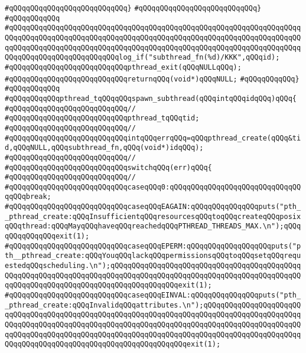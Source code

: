 \verb|#qQQqqQQqqQQqqQQqqQQqqQQqqQQq}|\newline
\verb|#qQQqqQQqqQQqqQQqqQQqqQQqqQQq}|\newline
\verb|#qQQqqQQqqQQq|\newline
\verb|#qQQqqQQqqQQqqQQqqQQqqQQqqQQqqQQqqQQqqQQqqQQqqQQqqQQqqQQqqQQqqQQqqQQqqQQqqQQqqQQqqQQqqQQqqQQqqQQqqQQqqQQqqQQqqQQqqQQqqQQqqQQqqQQqqQQqqQQqqQQqqQQqqQQqqQQqqQQqqQQqqQQqqQQqqQQqqQQqqQQqqQQqqQQqqQQqqQQqqQQqqQQqqQQqqQQqqQQqqQQqqQQqqQQqqQQqqQQqlog_if("subthread_fn(%d)/KKK",qQQqid);|\newline
\verb|#qQQqqQQqqQQqqQQqqQQqqQQqqQQqpthread_exit(qQQqNULLqQQq);|\newline
\verb|#qQQqqQQqqQQqqQQqqQQqqQQqqQQqreturnqQQq(void*)qQQqNULL;|\newline
\verb|#qQQqqQQqqQQq}|\newline
\verb|#qQQqqQQqqQQq|\newline
\verb|#qQQqqQQqqQQqpthread_tqQQqqQQqspawn_subthread(qQQqintqQQqidqQQq)qQQq{|\newline
\verb|#qQQqqQQqqQQqqQQqqQQqqQQqqQQq//|\newline
\verb|#qQQqqQQqqQQqqQQqqQQqqQQqqQQqpthread_tqQQqtid;|\newline
\verb|#qQQqqQQqqQQqqQQqqQQqqQQqqQQq//|\newline
\verb|#qQQqqQQqqQQqqQQqqQQqqQQqqQQqintqQQqerrqQQq=qQQqpthread_create(qQQq&tid,qQQqNULL,qQQqsubthread_fn,qQQq(void*)idqQQq);|\newline
\verb|#qQQqqQQqqQQqqQQqqQQqqQQqqQQq//|\newline
\verb|#qQQqqQQqqQQqqQQqqQQqqQQqqQQqswitchqQQq(err)qQQq{|\newline
\verb|#qQQqqQQqqQQqqQQqqQQqqQQqqQQq//|\newline
\verb|#qQQqqQQqqQQqqQQqqQQqqQQqqQQqcaseqQQq0:qQQqqQQqqQQqqQQqqQQqqQQqqQQqqQQqqQQqbreak;|\newline
\verb|#qQQqqQQqqQQqqQQqqQQqqQQqqQQqcaseqQQqEAGAIN:qQQqqQQqqQQqqQQqputs("pth__pthread_create:qQQqInsufficientqQQqresourcesqQQqtoqQQqcreateqQQqposixqQQqthread:qQQqMayqQQqhaveqQQqreachedqQQqPTHREAD_THREADS_MAX.\n");qQQqqQQqqQQqqQQqexit(1);|\newline
\verb|#qQQqqQQqqQQqqQQqqQQqqQQqqQQqcaseqQQqEPERM:qQQqqQQqqQQqqQQqqQQqputs("pth__pthread_create:qQQqYouqQQqlackqQQqpermissionsqQQqtoqQQqsetqQQqrequestedqQQqscheduling.\n");qQQqqQQqqQQqqQQqqQQqqQQqqQQqqQQqqQQqqQQqqQQqqQQqqQQqqQQqqQQqqQQqqQQqqQQqqQQqqQQqqQQqqQQqqQQqqQQqqQQqqQQqqQQqqQQqqQQqqQQqqQQqqQQqqQQqqQQqqQQqqQQqqQQqqQQqqQQqexit(1);|\newline
\verb|#qQQqqQQqqQQqqQQqqQQqqQQqqQQqcaseqQQqEINVAL:qQQqqQQqqQQqqQQqputs("pth__pthread_create:qQQqInvalidqQQqattributes.\n");qQQqqQQqqQQqqQQqqQQqqQQqqQQqqQQqqQQqqQQqqQQqqQQqqQQqqQQqqQQqqQQqqQQqqQQqqQQqqQQqqQQqqQQqqQQqqQQqqQQqqQQqqQQqqQQqqQQqqQQqqQQqqQQqqQQqqQQqqQQqqQQqqQQqqQQqqQQqqQQqqQQqqQQqqQQqqQQqqQQqqQQqqQQqqQQqqQQqqQQqqQQqqQQqqQQqqQQqqQQqqQQqqQQqqQQqqQQqqQQqqQQqqQQqqQQqqQQqqQQqqQQqqQQqqQQqqQQqexit(1);|\newline
